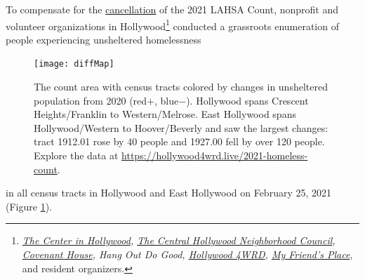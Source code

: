 \documentclass[11pt]{article}
\begin{document}
 To compensate for the \href{https://laist.com/latest/post/20201209/LAHSA-cancels-2021-homeless-count-los-angeles-covid-19}
{cancellation} of the 2021 LAHSA Count, nonprofit and volunteer organizations in Hollywood\footnote{
{\it \href{https://thecenterinhollywood.org}
{The Center in Hollywood}, \href{https://chnc.org}{The Central Hollywood Neighborhood Council}, 
\href{https://www.covenanthouse.org/spring-meal-match?sourceid=2483460&origin=DHQEI2109EZI0N&utm_source=2103marchmealmatchweb&utm_medium=cpc&utm_campaign=FY21MarchMealMatch&utm_content=bsd2103marchmealmatchweb&gclid=CjwKCAiAp4KCBhB6EiwAxRxbpJA2yM7lM2tyAqjVALZgBGvjnhobCJJ0XmuELFDXzM5xxZ0BqyX1ChoCLi0QAvD_BwE}{Covenant House}, 
Hang Out Do Good, \href{https://hollywood4wrd.live}{Hollywood 4WRD}, 
 \href{https://www.myfriendsplace.org/}{My Friend's Place}}, and resident organizers.} conducted a
grassroots enumeration of people experiencing unsheltered homelessness%
\begin{figure}
	\centering
	\texttt{[image: diffMap]}
	\caption{The count area with census tracts colored by  
			changes in unsheltered population from 2020 (red$+$, blue$-$).
			Hollywood spans Crescent Heights/Franklin to Western/Melrose. East Hollywood 
			spans Hollywood/Western to Hoover/Beverly and saw the largest changes:
			tract 1912.01 rose by 40 people and 1927.00 fell by over 120 people.
			Explore the data at \url{https://hollywood4wrd.live/2021-homeless-count}.}
	\label{fig:tcomp}
\end{figure} in all
census tracts in Hollywood and East Hollywood on February 25, 2021 (Figure \ref{fig:tcomp}).\\

%
\end{document}

